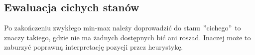 \subsection{Ewaluacja cichych stanów}
\label{subsec:ewaluacja-cichych-stanow}

{
    \color{red}
    \large Po zakończeniu zwykłego min-max należy doprowadzić do stanu \("\)cichego\("\) to znaczy takiego, gdzie nie ma żadnych dostępnych bić ani roszad.
Inaczej może to zaburzyć poprawną interpretację pozycji przez heurystykę.
}